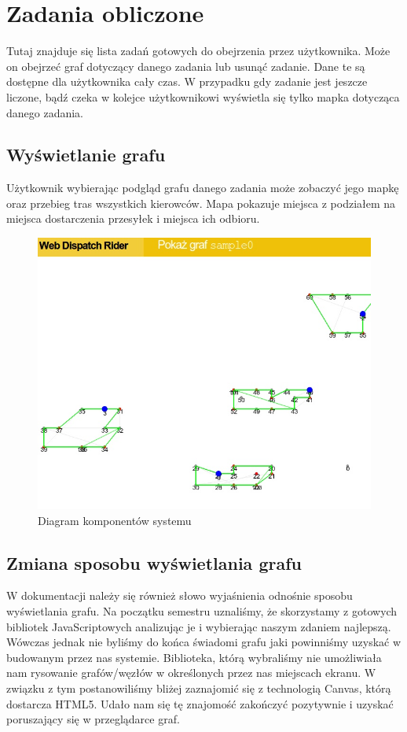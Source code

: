 \section{Zadania obliczone}
Tutaj znajduje się lista zadań gotowych do obejrzenia przez użytkownika. Może on obejrzeć graf dotyczący
danego zadania lub usunąć zadanie. Dane te są dostępne dla użytkownika cały czas. W przypadku gdy
zadanie jest jeszcze liczone, bądź czeka w kolejce użytkownikowi wyświetla się tylko mapka dotycząca danego zadania.

\subsection{Wyświetlanie grafu}
Użytkownik wybierając podgląd grafu danego zadania może zobaczyć jego mapkę oraz przebieg tras wszystkich kierowców.
Mapa pokazuje miejsca z podziałem na miejsca dostarczenia przesyłek i miejsca ich odbioru.
\newline

\begin{center}
\begin{figure}[H]
\centering
\includegraphics[scale=0.5]{imgs/graf.jpg}
\caption{Diagram komponentów systemu}
\label{fig:diagram_komponentow}
\end{figure}
\end{center}

\subsection{Zmiana sposobu wyświetlania grafu}
W dokumentacji należy się również słowo wyjaśnienia odnośnie sposobu wyświetlania grafu.
Na początku semestru uznaliśmy, że skorzystamy z gotowych bibliotek JavaScriptowych analizując je
i wybierając naszym zdaniem najlepszą. Wówczas jednak nie byliśmy do końca świadomi grafu jaki powinniśmy
uzyskać w budowanym przez nas systemie. Biblioteka, którą wybraliśmy nie umożliwiała nam rysowanie grafów/węzłów
w określonych przez nas miejscach ekranu. W związku z tym postanowiliśmy bliżej zaznajomić się z technologią Canvas,
którą dostarcza HTML5. Udało nam się tę znajomość zakończyć pozytywnie i uzyskać poruszający się w przeglądarce graf.